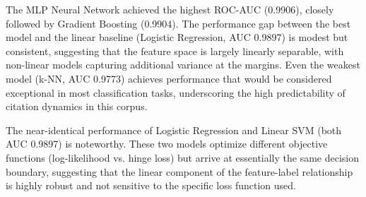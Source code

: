 \documentclass[12pt,a4paper]{article}
\begin{document}
\begin{table}[h!]
\centering
\caption{Model Performance on Dimensions Dataset (5-Fold Stratified CV, Mean $\pm$ Std)}
\label{tab:dim_results}
\end{table}

The MLP Neural Network achieved the highest ROC-AUC (0.9906), closely followed by Gradient Boosting (0.9904). The performance gap between the best model and the linear baseline (Logistic Regression, AUC 0.9897) is modest but consistent, suggesting that the feature space is largely linearly separable, with non-linear models capturing additional variance at the margins. Even the weakest model (k-NN, AUC 0.9773) achieves performance that would be considered exceptional in most classification tasks, underscoring the high predictability of citation dynamics in this corpus.

The near-identical performance of Logistic Regression and Linear SVM (both AUC 0.9897) is noteworthy. These two models optimize different objective functions (log-likelihood vs. hinge loss) but arrive at essentially the same decision boundary, suggesting that the linear component of the feature-label relationship is highly robust and not sensitive to the specific loss function used.
\end{document}
